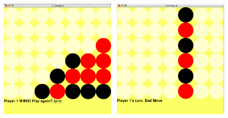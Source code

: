 \documentclass[12pt]{article}
\begin{document}
	\includegraphics[width=60mm,height=60mm]{report_images/05.png}
	\includegraphics[width=60mm,height=60mm]{report_images/bad.png} \\
\end{document}

